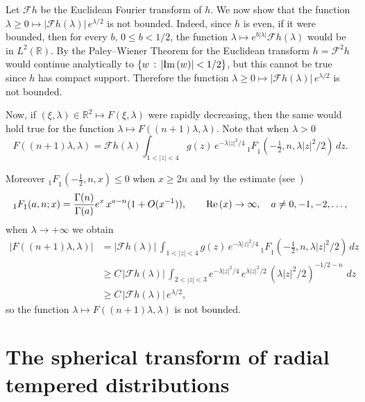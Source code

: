 \documentclass[12pt,a4paper]{amsart}
\theoremstyle{plain}
\theoremstyle{definition}
\numberwithin{equation}{section}
\begin{document}
Let $\mathcal{F}h$ be the Euclidean Fourier transform of $h$.
We now show that the function ${\lambda}\ge 0\mapsto |\mathcal{F}h({\lambda})|\,e^{{\lambda}/2}$
is not bounded. Indeed, since $h$ is even, if it were bounded, 
then  
for every $b$, $0\leq b<1/2$, the function 
${\lambda}\mapsto e^{b|{\lambda}|}\mathcal{F}h({\lambda})$ would be in $L^2({\mathbb R})$. By 
the Paley--Wiener Theorem for the Euclidean transform 
$h=\mathcal{F}^2h$ would continue analytically to
 ${\left\{{w\,:\, |{\text{\rm Im}\,}(w)|<1/2}\right\}}$, but this cannot
 be true since $h$ has compact support.
 Therefore the function ${\lambda}\ge 0\mapsto |\mathcal{F}h({\lambda})|\,e^{{\lambda}/2}$
is not bounded. 

Now, if $(\xi,{\lambda})\in {\mathbb R}^2\mapsto F(\xi,{\lambda})$ were rapidly decreasing, then the same
would hold true for the function
${\lambda}\mapsto F(({n}+1){\lambda},{\lambda})$. Note that when ${\lambda}>0$
$$
F(({n}+1){\lambda},{\lambda})=\mathcal{F}h({\lambda}) 
\int_{1<|z|<4}g(z)\, e^{-{\lambda} |z|^2/4}\, { {_{1} F}_{\!1}}(-\tfrac{1}{2}, {n},{\lambda} |z|^2/2)\, dz.
$$

 
Moreover ${ {_{1} F}_{\!1}}(-\tfrac{1}{2},{n},x)\leq 0$ when $x\geq 2{n}$
 and by the estimate 
(see~\cite[p.~27, formula~(3)]{E})
$${ {_{1} F}_{\!1}}(a,{n};x)=\frac{\Gamma({n})}{\Gamma(a)}e^x\,x^{a-{n}}(1+O(x^{-1})),
\qquad {\text{\rm Re}\,}(x)\to\infty,\quad a\not=0,-1,-2,\ldots,
$$
when ${\lambda}\to+\infty$ we obtain 
\begin{align*}
|F(({n}+1){\lambda},{\lambda})|
&=|\mathcal{F}h({\lambda})|\, 
\int_{1<|z|<4}  g(z)\,e^{-{\lambda} |z|^2/4}\, { {_{1} F}_{\!1}}(-\tfrac{1}{2}, {n},{\lambda} |z|^2/2)\, dz
\\
&
\geq C\,
|\mathcal{F}h({\lambda})|\, \int_{2<|z|<3}  e^{-{\lambda} |z|^2/4}\,
e^{{\lambda} |z|^2/2}\, ({\lambda} |z|^2/2)^{-1/2-{n}}\,\, dz
\\
&\geq C\, |\mathcal{F}h({\lambda})|\,e^{{\lambda}/2},
\end{align*}
so the function ${\lambda}\mapsto F(({n}+1){\lambda},{\lambda})$ is not bounded.
 

 
\section{The spherical transform of radial tempered distributions}
   
\end{document}
